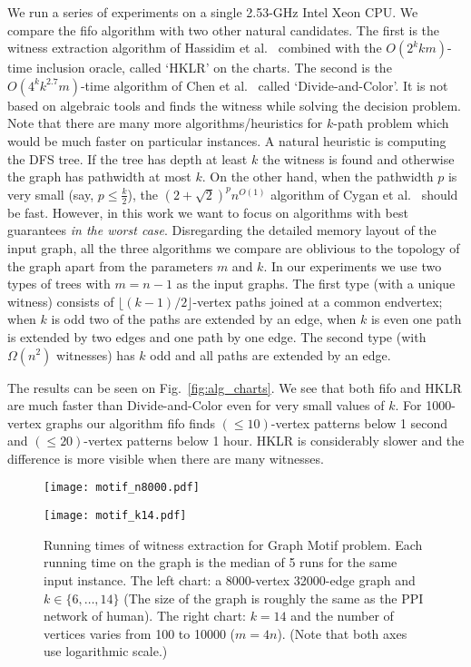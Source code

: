 \documentclass[11pt]{article}
\begin{document}
We run a series of experiments on a single 2.53-GHz Intel Xeon CPU. 
We compare the fifo algorithm with two other natural candidates. The first is the witness extraction algorithm of Hassidim et al.~\cite{hklr_wads} combined with the $O(2^kkm)$-time inclusion oracle, called `HKLR' on the charts. The second is the $O(4^kk^{2.7}m)$-time algorithm of Chen et al.~\cite{Chen+SICOMP09} called `Divide-and-Color'. It is not based on algebraic tools and finds the witness while solving the decision problem. 
Note that there are many more algorithms/heuristics for $k$-path problem which would be much faster on particular instances. 
A natural heuristic is computing the DFS tree. If the tree has depth at least $k$ the witness is found and otherwise the graph has pathwidth at most $k$. On the other hand, when the pathwidth $p$ is very small (say, $p\le \frac{k}2$), the $(2+\sqrt{2})^pn^{O(1)}$ algorithm of Cygan et al.~\cite{CNK:Hamiltonicity} should be fast. However, in this work we want to focus on algorithms with best guarantees {\em in the worst case}. Disregarding the detailed memory layout of the input graph, all the three algorithms we compare are oblivious to the topology of the graph apart from the parameters $m$ and $k$. In our experiments we use two types of trees with $m=n-1$ as the input graphs. 
The first type (with a unique witness) consists of $\lfloor (k-1)/2\rfloor$-vertex paths joined at a common endvertex; when $k$ is odd two of the paths are extended by an edge, when $k$ is even one path is extended by two edges and one path by one edge. The second type (with $\Omega(n^2)$ witnesses) has $k$ odd and all paths are extended by an edge.

The results can be seen on Fig.~\ref{fig:alg_charts}. We see that both fifo and HKLR are much faster than Divide-and-Color even for very small values of $k$. For 1000-vertex graphs our algorithm fifo finds $(\le 10)$-vertex patterns below 1 second and $(\le 20)$-vertex patterns below 1 hour.
HKLR is considerably slower and the difference is more visible when there are many witnesses. 

\begin{figure}[t]
\begin{minipage}[b]{0.5\linewidth}
\centering
\texttt{[image: motif\_n8000.pdf]}
\end{minipage}
\begin{minipage}[b]{0.5\linewidth}
\centering
\texttt{[image: motif\_k14.pdf]}
\end{minipage}
\caption{Running times of witness extraction for Graph Motif problem. 
         Each running time on the graph is the median of 5 runs for the same input instance.
         The left chart: a 8000-vertex 32000-edge graph and $k\in\{6,\ldots,14\}$ 
         (The size of the graph is roughly the same as the PPI network of human).
         The right chart: $k=14$ and the number of vertices varies from 100 to 10000 ($m=4n$).
         (Note that both axes use logarithmic scale.)
         }
\label{fig:motif_charts}
\end{figure}
\end{document}

